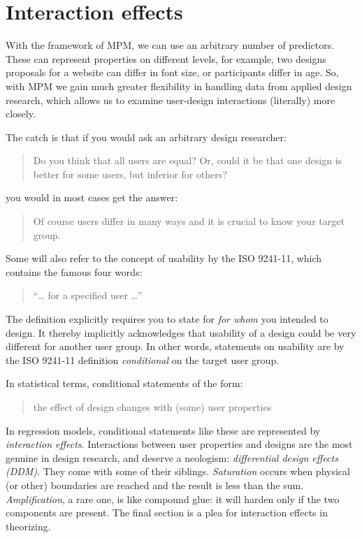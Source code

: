 \documentclass[]{svmono}
\theoremstyle{definition}
\theoremstyle{definition}
\theoremstyle{definition}
\theoremstyle{remark}
\begin{document}
\section{Interaction effects}\label{interaction-effects}

With the framework of MPM, we can use an arbitrary number of predictors.
These can represent properties on different levels, for example, two
designs proposals for a website can differ in font size, or participants
differ in age. So, with MPM we gain much greater flexibility in handling
data from applied design research, which allows us to examine
user-design interactions (literally) more closely.

The catch is that if you would ask an arbitrary design researcher:

\begin{quote}
Do you think that all users are equal? Or, could it be that one design
is better for some users, but inferior for others?
\end{quote}

you would in most cases get the answer:

\begin{quote}
Of course users differ in many ways and it is crucial to know your
target group.
\end{quote}

Some will also refer to the concept of usability by the ISO 9241-11,
which contains the famous four words:

\begin{quote}
``\ldots{} for a specified user \ldots{}''
\end{quote}

The definition explicitly requires you to state for \emph{for whom} you
intended to design. It thereby implicitly acknowledges that usability of
a design could be very different for another user group. In other words,
statements on usability are by the ISO 9241-11 definition
\emph{conditional} on the target user group.

In statistical terms, conditional statements of the form:

\begin{quote}
the effect of design changes with (some) user properties
\end{quote}

In regression models, conditional statements like these are represented
by \emph{interaction effects}. Interactions between user properties and
designs are the most genuine in design research, and deserve a
neologism: \emph{differential design effects (DDM)}. They come with some
of their siblings. \emph{Saturation} occurs when physical (or other)
boundaries are reached and the result is less than the sum.
\emph{Amplification}, a rare one, is like compound glue: it will harden
only if the two components are present. The final section is a plea for
interaction effects in theorizing.
\end{document}

